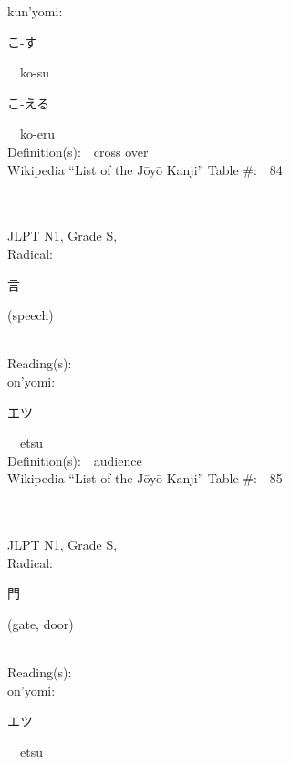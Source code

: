 \begin{multicols}{2}
{\hspace*{1em}}kun'yomi:\ \ \\
{\hspace*{2em}}{\begin{CJK}{UTF8}{min} こ-す \end{CJK}}\ \ ko-su\ \ \\
{\hspace*{2em}}{\begin{CJK}{UTF8}{min} こ-える \end{CJK}}\ \ ko-eru\ \ \\
Definition(s):\ \ cross over \\
Wikipedia ``List of the J\=oy\=o Kanji'' Table \#:\ \ 84 \\
\ \ \\
{\fontsize{34pt}{40pt}  }\ \ \\
{JLPT N1, Grade S, \\Radical:\ \ {\begin{CJK}{UTF8}{min} 言 \end{CJK}} (speech) } \\
Reading(s):\ \ \\
{\hspace*{1em}}on'yomi:\ \ \\
{\hspace*{2em}}{\begin{CJK}{UTF8}{min} エツ \end{CJK}}\ \ etsu\ \ \\
Definition(s):\ \ audience \\
Wikipedia ``List of the J\=oy\=o Kanji'' Table \#:\ \ 85 \\
\ \ \\
{\fontsize{34pt}{40pt}  }\ \ \\
{JLPT N1, Grade S, \\Radical:\ \ {\begin{CJK}{UTF8}{min} 門 \end{CJK}} (gate, door) } \\
Reading(s):\ \ \\
{\hspace*{1em}}on'yomi:\ \ \\
{\hspace*{2em}}{\begin{CJK}{UTF8}{min} エツ \end{CJK}}\ \ etsu\ \ \\

\end{multicols}
